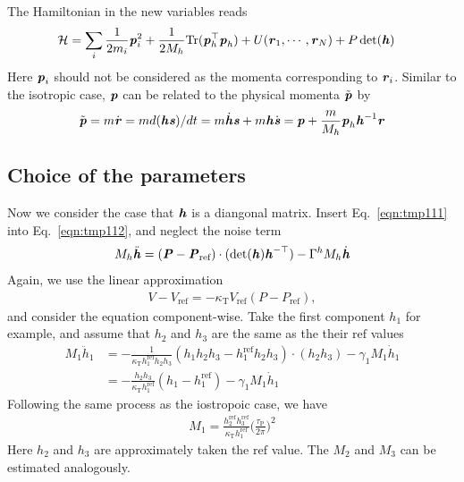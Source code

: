 \documentclass[aps, pre, preprint,unsortedaddress,a4paper,onecolumn]{revtex4}
\newcommand{\vect}[1]{\textbf{\textit{#1}}}
\newcommand{\target}{\textrm{ref}}
\newcommand{\trace}{\textrm{Tr}}
\newcommand{\dvs}{\dot{\vect s}}
\newcommand{\dvh}{\dot{\vect h}}
\newcommand{\dvr}{\dot{\vect r}}
\newcommand{\inv}{{-1}}
\newcommand{\temp}[0]{{\textrm{T}}}
\newcommand{\pres}[0]{{\textrm{P}}}
\begin{document}
The Hamiltonian in the new variables reads
\begin{align}\nonumber
  \mathcal H
  & = \sum_i \frac1{2m_i} \vect p^2_i + \frac1{2M_h}\trace (\vect p_h^\top \vect p_h)  + U(\vect r_1, \cdots, \vect r_N) + P\det (\vect h)
\end{align}
Here $\vect p_i$ should not be considered as the momenta corresponding to $\vect r_i$.
Similar to the isotropic case, $\vect p$ can be related to the physical momenta $\tilde {\vect p}$ by
\begin{align}
  \tilde{ \vect p} = m\dvr = m d(\vect h\vect s)/dt = m\dvh\vect s + m\vect h\dvs = \vect p + \frac m{M_h} \vect p_h\vect h^\inv\vect r
\end{align}

\subsection{Choice of the parameters}

Now we consider the case that $\vect h$ is a diangonal matrix.
Insert Eq.~\eqref{eqn:tmp111} into Eq.~\eqref{eqn:tmp112}, and neglect the noise term
\begin{align}
  M_h \ddot {\vect h} =
  (\vect P - \vect P_{\textrm{ref}}) \cdot (\det (\vect h) \vect h^{-\top})
  - \Gamma^h M_h \dot{\vect h}
\end{align}
Again, we use the linear approximation
\begin{align}
  V- V_\target = -\kappa_\temp V_\target (P - P_\target),
\end{align}
and consider the equation component-wise. Take the first component
$h_1$ for example, and assume that $h_2$ and $h_3$ are the same as the
their $\target$ values
\begin{align}\nonumber
  M_1 \ddot{h}_1 &=
                   - \frac{1}{\kappa_\temp h^\target_1h_2h_3}(h_1h_2h_3 - h_1^\target h_2 h_3) \cdot (h_2 h_3) - \gamma_1 M_1 \dot{ h}_1 \\
                 & =
                   - \frac{h_2h_3}{\kappa_\temp h^\target_1}(h_1 - h_1^\target)  - \gamma_1 M_1 \dot{ h}_1 
\end{align}
Following the same process as the iostropoic case, we have
\begin{align}
  M_1 = \frac{h^\target_2 h^\target_3}{\kappa_\temp h^\target_1} \Big( \frac{\tau_\pres}{2\pi}\Big)^2
\end{align}
Here $h_2$ and $h_3$ are approximately taken the $\target$ value.
The $M_2$ and $M_3$ can be estimated analogously.

% 
\end{document}
